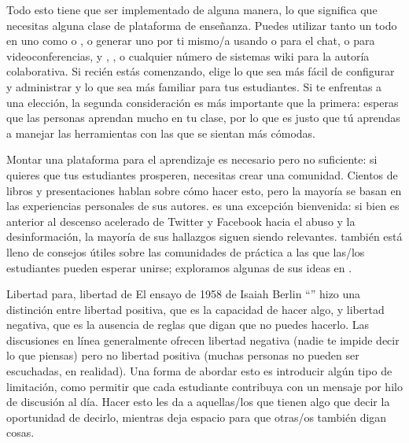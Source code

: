 Todo esto tiene que ser implementado de alguna manera,
lo que significa que necesitas alguna clase de plataforma de enseñanza.
Puedes utilizar tanto un  todo en uno
como  o ,
o generar uno por ti mismo/a
usando  o  para el chat,
o  para videoconferencias,
y ,
,
o cualquier número de sistemas wiki para la autoría colaborativa.
Si recién estás comenzando,
elige lo que sea más fácil de configurar y administrar
y lo que sea más familiar para tus estudiantes.
Si te enfrentas a una elección,
la segunda consideración es más importante que la primera:
esperas que las personas aprendan mucho en tu clase,
por lo que es justo que tú aprendas a manejar las herramientas con las que se sientan más cómodas.

Montar una plataforma para el aprendizaje es necesario pero no suficiente:
si quieres que tus estudiantes prosperen,
necesitas crear una comunidad.
Cientos de libros y presentaciones hablan sobre cómo hacer esto,
pero la mayoría se basan en las experiencias personales de sus autores.
\cite{Krau2016} es una excepción bienvenida:
si bien es anterior al descenso acelerado de Twitter y Facebook hacia el abuso y la desinformación,
la mayoría de sus hallazgos siguen siendo relevantes.
\cite{Foge2005} también está lleno de consejos útiles
sobre las comunidades de práctica a las que las/los estudiantes pueden esperar unirse;
exploramos algunas de sus ideas en .

\begin{aside}{Libertad para, libertad de}
  El ensayo de 1958 de Isaiah Berlin
  ``''
  hizo una distinción entre libertad positiva,
  que es la capacidad de hacer algo,
  y libertad negativa,
  que es la ausencia de reglas que digan que no puedes hacerlo.
  Las discusiones en línea generalmente ofrecen libertad negativa
  (nadie te impide decir lo que piensas)
  pero no libertad positiva
  (muchas personas no pueden ser escuchadas, en realidad).
  Una forma de abordar esto es introducir algún tipo de limitación,
  como permitir que cada estudiante contribuya con un mensaje por hilo de discusión al día.
  Hacer esto les da a aquellas/los que tienen algo que decir la oportunidad de decirlo,
  mientras deja espacio para que otras/os también digan cosas.
\end{aside}

